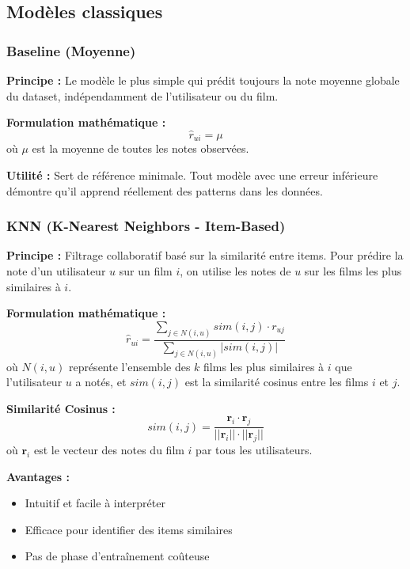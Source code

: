 \documentclass[12pt,a4paper]{article}
\begin{document}
\subsection{Modèles classiques}

\subsubsection{Baseline (Moyenne)}

\textbf{Principe :} Le modèle le plus simple qui prédit toujours la note moyenne globale du dataset, indépendamment de l'utilisateur ou du film.

\textbf{Formulation mathématique :}
\begin{equation}
    \hat{r}_{ui} = \mu
\end{equation}
où $\mu$ est la moyenne de toutes les notes observées.

\textbf{Utilité :} Sert de référence minimale. Tout modèle avec une erreur inférieure démontre qu'il apprend réellement des patterns dans les données.

\subsubsection{KNN (K-Nearest Neighbors - Item-Based)}

\textbf{Principe :} Filtrage collaboratif basé sur la similarité entre items. Pour prédire la note d'un utilisateur $u$ sur un film $i$, on utilise les notes de $u$ sur les films les plus similaires à $i$.

\textbf{Formulation mathématique :}
\begin{equation}
    \hat{r}_{ui} = \frac{\sum_{j \in N(i,u)} sim(i,j) \cdot r_{uj}}{\sum_{j \in N(i,u)} |sim(i,j)|}
\end{equation}
où $N(i,u)$ représente l'ensemble des $k$ films les plus similaires à $i$ que l'utilisateur $u$ a notés, et $sim(i,j)$ est la similarité cosinus entre les films $i$ et $j$.

\textbf{Similarité Cosinus :}
\begin{equation}
    sim(i,j) = \frac{\mathbf{r}_i \cdot \mathbf{r}_j}{||\mathbf{r}_i|| \cdot ||\mathbf{r}_j||}
\end{equation}
où $\mathbf{r}_i$ est le vecteur des notes du film $i$ par tous les utilisateurs.

\textbf{Avantages :}
\begin{itemize}
    \item Intuitif et facile à interpréter
    \item Efficace pour identifier des items similaires
    \item Pas de phase d'entraînement coûteuse
\end{itemize}
\end{document}
